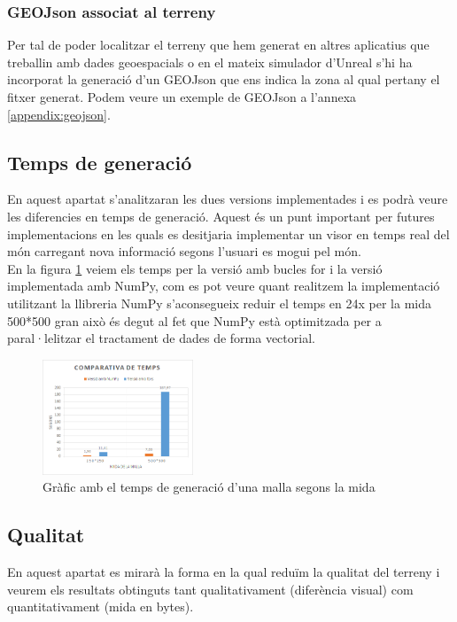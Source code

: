 \documentclass[10pt,a4paper,twocolumn,twoside]{article}
\begin{document}
\subsubsection{GEOJson associat al terreny}
Per tal de poder localitzar el terreny que hem generat en altres aplicatius que treballin amb dades geoespacials o en el mateix simulador d'Unreal s'hi ha incorporat la generació d'un GEOJson que ens indica la zona al qual pertany el fitxer generat. Podem veure un exemple de GEOJson a l'annexa \ref{appendix:geojson}.

\subsection{Temps de generació}
En aquest apartat s'analitzaran les dues versions implementades i es podrà veure les diferencies en temps de generació. Aquest és un punt important per futures implementacions en les quals es desitjaria implementar un visor en temps real del món carregant nova informació segons l'usuari es mogui pel món. 
\\
En la figura \ref{fig-meshtime} veiem els temps per la versió amb bucles for i la versió implementada amb NumPy, com es pot veure quant realitzem la implementació utilitzant la llibreria NumPy s'aconsegueix reduir el temps en 24x per la mida 500*500 gran això és degut al fet que NumPy està optimitzada per a paral·lelitzar el tractament de dades de forma vectorial.

\begin{figure}[!h]
\centering
  	\includegraphics[width=0.4\textwidth]{meshtime}
	\caption{Gràfic amb el temps de generació d'una malla segons la mida}
	\label{fig-meshtime}
\end{figure}

\subsection{Qualitat}
\label{qualitat}
En aquest apartat es mirarà la forma en la qual reduïm la qualitat del terreny i veurem els resultats obtinguts tant qualitativament (diferència visual) com quantitativament (mida en bytes).
\end{document}
